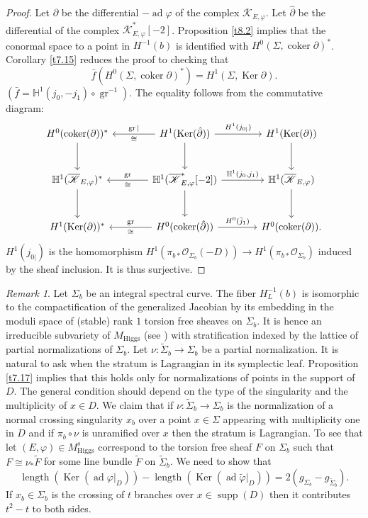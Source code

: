 \documentclass[12pt,a4paper,oneside,english]{smfart}
\theoremstyle{definition}
\theoremstyle{remark}
\newtheorem{rem}[thm]{Remark}
\DeclareMathOperator{\ad}{ad}
\DeclareMathOperator{\length}{length}
\DeclareMathOperator{\gr}{gr}
\DeclareMathOperator{\Ker}{Ker}
\DeclareMathOperator{\coker}{coker}
\DeclareMathOperator{\supp}{supp}
\newcommand{\Hig}{\mathrm{Higgs}}
\newcommand{\MH}{M_{\Hig}}
\newcommand{\MHs}{M^{s}_{\Hig}}
\newcommand{\cO}{\mathcal{O}}
\newcommand{\KK}{\mathscr{K}}
\newcommand{\HH}{\mathbb{H}}
\begin{document}
\begin{proof}
Let $\partial$ be the differential $-\ad \varphi$ of the complex $\overline{\KK}_{E, \varphi}$. Let $\hat{\partial}$ be the differential of the complex $\overline{\KK}^*_{E, \varphi}[-2]$. Proposition \ref{t8.2} implies that the conormal space to a point in $H^{-1}(b)$ is identified with $H^0(\Sigma, \coker \partial)^*$. Corollary \ref{t7.15} reduces the proof to checking that
\[
\bar{f}(H^0(\Sigma, \coker \partial)^*) = H^1(\Sigma, \Ker \partial).
\]
$(\bar{f} = \HH^1(j_0, -j_1) \circ \gr^{-1})$. The equality follows from the commutative diagram:
\[
\begin{tikzcd}[column sep=large, row sep=large]
H^0(\coker(\partial))^* \arrow[d]
  & H^1(\Ker(\hat{\partial})) \arrow[l, "\gr|"', "\cong"] \arrow[r, "H^1(j_{0|})"] \arrow[d]
  & H^1(\Ker(\partial)) \arrow[d] \\
\HH^1(\overline{\KK}_{E, \varphi})^* \arrow[d]
  & \HH^1(\overline{\KK}^*_{E, \varphi}[-2]) \arrow[l, "\gr"', "\cong"] \arrow[r, "{\HH^1(j_0, j_1)}"] \arrow[d]
  & \HH^1(\overline{\KK}_{E, \varphi}) \arrow[d] \\
H^1(\Ker(\partial))^*
  & H^0(\coker(\hat{\partial})) \arrow[l, "\gr"', "\cong"] \arrow[r, "H^0(\bar{j}_1)"]
  & H^0(\coker(\partial)).
\end{tikzcd}
\]
$H^1(j_{0|})$ is the homomorphism $H^1(\pi_{b*}\cO_{\Sigma_b}(-D)) \to H^1(\pi_{b*}\cO_{\Sigma_b})$ induced by the sheaf inclusion. It is thus surjective.
\end{proof}

\begin{rem}\label{t8.4}
Let $\Sigma_b$ be an integral spectral curve. The fiber $H_L^{-1}(b)$ is isomorphic to the compactification of the generalized Jacobian by its embedding in the moduli space of (stable) rank $1$ torsion free sheaves on $\Sigma_b$. It is hence an irreducible subvariety of $\MH$ (see \cite{A-I-K}) with stratification indexed by the lattice of partial normalizations of $\Sigma_b$. Let $\nu \colon \tilde{\Sigma}_b \to \Sigma_b$ be a partial normalization. It is natural to ask when the stratum is Lagrangian in its symplectic leaf. Proposition \ref{t7.17} implies that this holds only for normalizations of points in the support of $D$. The general condition should depend on the type of the singularity and the multiplicity of $x \in D$. We claim that if $\nu \colon \tilde{\Sigma}_b \to \Sigma_b$ is the normalization of a normal crossing singularity $x_b$ over a point $x \in \Sigma$ appearing with multiplicity one in $D$ and if $\pi_b \circ \nu$ is unramified over $x$ then the stratum is Lagrangian. To see that let $(E, \varphi) \in \MHs$ correspond to the torsion free sheaf $F$ on $\Sigma_b$ such that $F \cong \nu_* \tilde{F}$ for some line bundle $\tilde{F}$ on $\tilde{\Sigma}_b$. We need to show that
\[
\length(\Ker(\ad \varphi|_D)) - \length(\Ker(\ad \tilde{\varphi}|_D)) = 2(g_{\Sigma_b} - g_{\tilde{\Sigma}_b}).
\]
If $x_b \in \Sigma_b$ is the crossing of $t$ branches over $x \in \supp(D)$ then it contributes $t^2 - t$ to both sides.
\end{rem}
\end{document}
